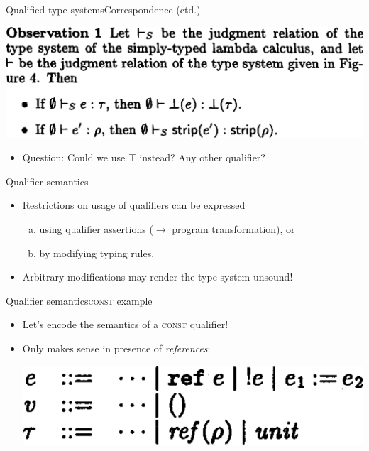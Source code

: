 \documentclass{beamer}
\begin{document}
\begin{frame}{Qualified type systems}{Correspondence (ctd.)}
  \begin{center}
  \includegraphics[scale=0.25]{paper_observation1.png}
  \end{center}

  \bigskip
  \begin{itemize}
  \item<2-> Question: Could we use $\top$ instead? Any other qualifier?
  \end{itemize}
\end{frame}



\begin{frame}{Qualifier semantics}
  \begin{itemize}
  \item Restrictions on usage of qualifiers can be expressed
    \begin{enumerate}[a)]
    \item using qualifier assertions ($\rightarrow$ program transformation), or
    \item by modifying typing rules.
    \end{enumerate}
  \item Arbitrary modifications may render the type system unsound!
  \end{itemize}
\end{frame}

\begin{frame}{Qualifier semantics}{\textsc{const} example}
  \begin{itemize}
  \item Let's encode the semantics of a \textsc{const} qualifier!
  \item<2-> Only makes sense in presence of \emph{references}:
    \begin{center}
    \includegraphics[scale=0.3]{paper_ref_syntax.png}
    \end{center}
  \end{itemize}
\end{frame}
\end{document}
